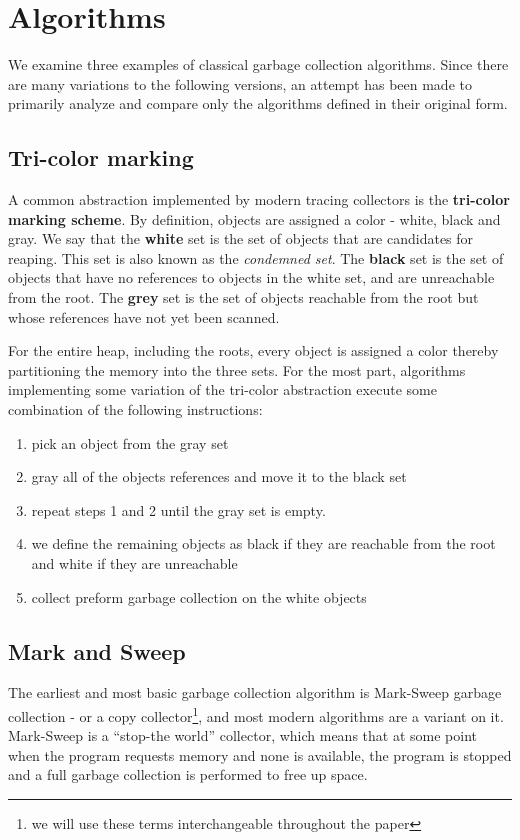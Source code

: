\documentclass[11pt,leqno]{article}
\newcommand{\mydef}[1]{\textbf{#1}}
\begin{document}
\section{Algorithms}
We examine three examples of classical garbage collection algorithms. Since there are many variations to the following versions, an attempt has been made to primarily analyze and compare only the algorithms defined in their original form.  

\subsection{Tri-color marking}
A common abstraction implemented by modern tracing collectors is the \mydef{tri-color marking scheme}\cite{wiki:garbage_collection}. By definition, objects are assigned a color - white, black and gray. We say that the
\textbf{white} set is the set of objects that are candidates for reaping. This set is also known as the \textit{condemned set}. 
The \textbf{black} set is the set of objects that have no references to objects in the white set, and are unreachable from the root. The \textbf{grey} set is the set of objects reachable from the root but whose references have not yet been scanned.

For the entire heap, including the roots, every object is assigned a color thereby partitioning the memory into the three sets. For the most part, algorithms implementing some variation of the tri-color abstraction execute some combination of the following instructions: 
\begin{enumerate}
  \item pick an object from the gray set
  \item gray all of the objects references and move it to the black set
  \item repeat steps 1 and 2 until the gray set is empty.
  \item we define the remaining objects as black if they are reachable from the root and white if they are unreachable
  \item collect preform garbage collection on the white objects
\end{enumerate}

\subsection{Mark and Sweep}
The earliest and most basic garbage collection algorithm is Mark-Sweep garbage collection\cite{mccarthy} - or a copy collector\footnote{we will use these terms interchangeable throughout the paper}, and most modern algorithms are a variant on it. Mark-Sweep is a “stop-the world” collector, which means that at some point when the program requests memory and none is available, the program is stopped and a full garbage collection is performed to free up space. 
\end{document}
